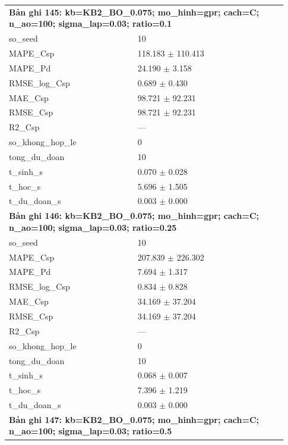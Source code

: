 \begin{longtable}{p{0.43\linewidth}p{0.50\linewidth}}
\midrule
\multicolumn{2}{p{0.95\linewidth}}{\textbf{Bản ghi 145: kb=KB2\_BO\_0.075; mo\_hinh=gpr; cach=C; n\_ao=100; sigma\_lap=0.03; ratio=0.1}} \\
so\_\allowbreak seed & 10 \\
MAPE\_\allowbreak Csp & 118.183 $\pm$ 110.413 \\
MAPE\_\allowbreak Pd & 24.190 $\pm$ 3.158 \\
RMSE\_\allowbreak log\_\allowbreak Csp & 0.689 $\pm$ 0.430 \\
MAE\_\allowbreak Csp & 98.721 $\pm$ 92.231 \\
RMSE\_\allowbreak Csp & 98.721 $\pm$ 92.231 \\
R2\_\allowbreak Csp & — \\
so\_\allowbreak khong\_\allowbreak hop\_\allowbreak le & 0 \\
tong\_\allowbreak du\_\allowbreak doan & 10 \\
t\_\allowbreak sinh\_\allowbreak s & 0.070 $\pm$ 0.028 \\
t\_\allowbreak hoc\_\allowbreak s & 5.696 $\pm$ 1.505 \\
t\_\allowbreak du\_\allowbreak doan\_\allowbreak s & 0.003 $\pm$ 0.000 \\
\midrule
\multicolumn{2}{p{0.95\linewidth}}{\textbf{Bản ghi 146: kb=KB2\_BO\_0.075; mo\_hinh=gpr; cach=C; n\_ao=100; sigma\_lap=0.03; ratio=0.25}} \\
so\_\allowbreak seed & 10 \\
MAPE\_\allowbreak Csp & 207.839 $\pm$ 226.302 \\
MAPE\_\allowbreak Pd & 7.694 $\pm$ 1.317 \\
RMSE\_\allowbreak log\_\allowbreak Csp & 0.834 $\pm$ 0.828 \\
MAE\_\allowbreak Csp & 34.169 $\pm$ 37.204 \\
RMSE\_\allowbreak Csp & 34.169 $\pm$ 37.204 \\
R2\_\allowbreak Csp & — \\
so\_\allowbreak khong\_\allowbreak hop\_\allowbreak le & 0 \\
tong\_\allowbreak du\_\allowbreak doan & 10 \\
t\_\allowbreak sinh\_\allowbreak s & 0.068 $\pm$ 0.007 \\
t\_\allowbreak hoc\_\allowbreak s & 7.396 $\pm$ 1.219 \\
t\_\allowbreak du\_\allowbreak doan\_\allowbreak s & 0.003 $\pm$ 0.000 \\
\midrule
\multicolumn{2}{p{0.95\linewidth}}{\textbf{Bản ghi 147: kb=KB2\_BO\_0.075; mo\_hinh=gpr; cach=C; n\_ao=100; sigma\_lap=0.03; ratio=0.5}} \\

\end{longtable}
